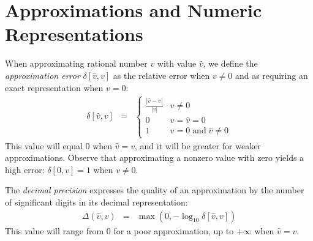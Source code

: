 \documentclass[
hf
]{ceurart}
\newcommand{\approximate}[1]{\hat{#1}}
\newcommand{\approxv}{\approximate{v}}
\newcommand{\aerror}{\delta}
\newcommand{\digitprecision}{\Delta}
\begin{document}
\section{Approximations and Numeric Representations}
\label{sect:background:numbers}

When approximating rational number $v$ with value $\approxv$, we
define the \emph{approximation error} $\aerror[\approxv, v]$
as the relative error when $v \not = 0$ and as requiring an exact representation when $v = 0$:
\begin{eqnarray}
\aerror[\approxv, v] & = & \left\{ \begin{array}{ll}
  \frac{|\approxv - v|}{|v|}  & v \not = 0\\
  0 & v  = \approxv = 0\\
  1 & v = 0 \; \textrm{and} \; \approxv \not = 0
  \end{array} \right. \label{eqn:approx:error}
\end{eqnarray}
This value will equal 0 when $\approxv=v$, and it will be greater for weaker approximations.
Observe that approximating a nonzero value with zero yields a high error:  $\aerror[0, v] = 1$ when $v\not=0$.

The \emph{decimal precision} expresses the quality of an approximation by the number of significant digits in its decimal representation:
\begin{eqnarray}
\digitprecision(\approxv, v) & = & \max(0, -\log_{10} \aerror[\approxv, v]) \label{eqn:digitprecision} 
\end{eqnarray}
This value will range from $0$ for a poor approximation, up to $+\infty$ when $\approxv=v$.
\end{document}
